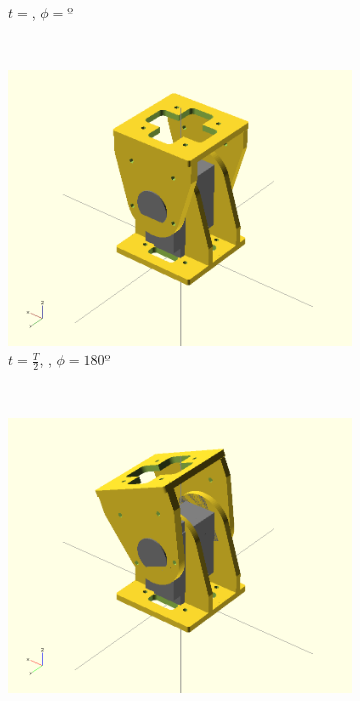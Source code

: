 \begin{figure}[h]
\begin{subfigure}[b]{0.18\textwidth}
                \caption{$t = $, $\phi=º$}
                \label{fig:Gait_osc_center_112_5-2}
        \end{subfigure}
        ~
        \begin{subfigure}[b]{0.18\textwidth}
         	   \centering
                \includegraphics[width=\textwidth]{images/Gait_osc_center_90.png}
                \caption{$t = \frac{T}{2}$, , $\phi=180º$}
                \label{fig:Gait_osc_center_90-2}
        \end{subfigure}
        ~
                \begin{subfigure}[b]{0.18\textwidth}
                \centering
                \includegraphics[width=\textwidth]{images/Gait_osc_center_62_5.png}

\end{subfigure}
\end{figure}
